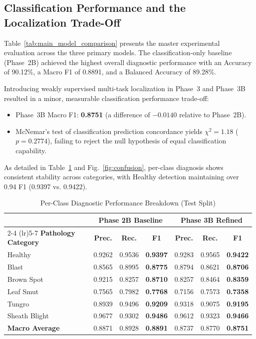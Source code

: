 \documentclass[conference]{IEEEtran}
\begin{document}
\subsection{Classification Performance and the Localization Trade-Off}
Table~\ref{tab:main_model_comparison} presents the master experimental evaluation across the three primary models. The classification-only baseline (Phase~2B) achieved the highest overall diagnostic performance with an Accuracy of 90.12\%, a Macro F1 of 0.8891, and a Balanced Accuracy of 89.28\%.

Introducing weakly supervised multi-task localization in Phase~3 and Phase~3B resulted in a minor, measurable classification performance trade-off:
\begin{itemize}
    \item Phase~3B Macro F1: \textbf{0.8751} (a difference of $-0.0140$ relative to Phase~2B).
    \item McNemar's test of classification prediction concordance yields $\chi^2 = 1.18$ ($p = 0.2774$), failing to reject the null hypothesis of equal classification capability.
\end{itemize}

As detailed in Table~\ref{tab:per_class} and Fig.~\ref{fig:confusion}, per-class diagnosis shows consistent stability across categories, with Healthy detection maintaining over 0.94 F1 (0.9397 vs. 0.9422).

\begin{table}[htbp]
\centering
\caption{Per-Class Diagnostic Performance Breakdown (Test Split)}
\label{tab:per_class}
\scriptsize
\setlength{\tabcolsep}{3.0pt}
\begin{tabular}{lcccccc}
\toprule
 & \multicolumn{3}{c}{\textbf{Phase 2B Baseline}} & \multicolumn{3}{c}{\textbf{Phase 3B Refined}} \\
\cmidrule(lr){2-4} \cmidrule(lr){5-7}
\textbf{Pathology Category} & \textbf{Prec.} & \textbf{Rec.} & \textbf{F1} & \textbf{Prec.} & \textbf{Rec.} & \textbf{F1} \\
\midrule
Healthy & 0.9262 & 0.9536 & \textbf{0.9397} & 0.9283 & 0.9565 & \textbf{0.9422} \\
Blast & 0.8565 & 0.8995 & \textbf{0.8775} & 0.8794 & 0.8621 & \textbf{0.8706} \\
Brown Spot & 0.9215 & 0.8257 & \textbf{0.8710} & 0.8257 & 0.8464 & \textbf{0.8359} \\
Leaf Smut & 0.7565 & 0.7982 & \textbf{0.7768} & 0.7156 & 0.7573 & \textbf{0.7358} \\
Tungro & 0.8939 & 0.9496 & \textbf{0.9209} & 0.9318 & 0.9075 & \textbf{0.9195} \\
Sheath Blight & 0.9677 & 0.9302 & \textbf{0.9486} & 0.9612 & 0.9323 & \textbf{0.9466} \\
\midrule
\textbf{Macro Average} & 0.8871 & 0.8928 & \textbf{0.8891} & 0.8737 & 0.8770 & \textbf{0.8751} \\
\bottomrule
\end{tabular}
\end{table}
\end{document}
